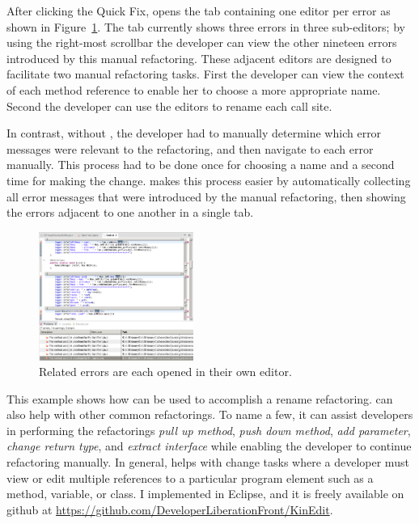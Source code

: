\documentclass{sigplanconf}
\begin{document}
After clicking the Quick Fix, \pname{} opens the tab containing one editor
per error as shown in Figure~\ref{mult}. The tab currently shows three
errors in three sub-editors; by using the right-most scrollbar the developer
can view the other nineteen errors introduced by this manual refactoring.
These adjacent editors are designed to facilitate two manual refactoring tasks.
First the developer can view the context of each method reference to enable
her to choose a more appropriate name. Second the developer can use
the editors to rename each call site.

In contrast, without \pname{}, the developer had to
manually determine which error messages were relevant to the refactoring, and
then navigate to each error manually. This process had to be done once for
choosing a name and a second time for making the change. \pname{} makes this
process
easier by automatically collecting all error messages that were introduced by
the manual refactoring, then showing the errors adjacent to one another in a
single tab.

\begin{figure}[h]
\begin{center}
\includegraphics[width=0.45\textwidth]{multiple-editors.png}
\caption{Related errors are each opened in their own editor.\label{mult}}
\end{center}
\end{figure}

This example shows how \pname{} can be used to accomplish a rename refactoring.
\pname{} can also help with other common refactorings.
To name a few, it can assist developers in performing the refactorings
\textit{pull up method}, \textit{push down method}, \textit{add parameter},
\textit{change return type}, and \textit{extract interface}
while enabling the developer to continue refactoring manually. In general,
\pname{} helps with change tasks where a developer must view or edit multiple
references to a particular program element such as a method, variable, or
class.
I implemented \pname{} in Eclipse, and it is freely available on
github at \url{https://github.com/DeveloperLiberationFront/KinEdit}.
\end{document}

